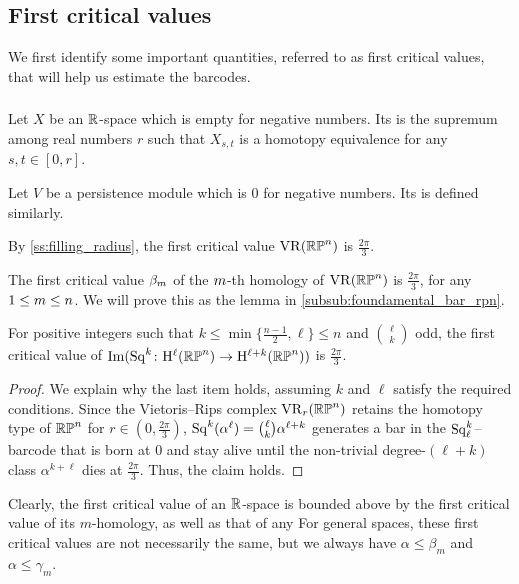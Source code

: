 \subsection{First critical values}

We first identify some important quantities, referred to as first critical values, that will help us estimate the barcodes.

\subsubsection{}
\label{subsub:first_critical_value}

 Let $X$ be an $\mathbb{R}$-space which is empty for negative numbers.
Its  is the supremum among real numbers $r$ such that $X_{s,t}$ is a homotopy equivalence for any $s,t \in [0,r]$. 

Let $V$ be a persistence module which is $0$ for negative numbers.
Its  is defined similarly. 

\medskip\example
By \cref{ss:filling_radius}, the first critical value $\operatorname{VR}(\mathbb{RP}^n)$ is $\tfrac{2\pi}{3}$.

    The first critical value $\beta_m$ of the $m$-th homology of $\operatorname{VR}(\mathbb{RP}^n)$ is $\tfrac{2\pi}{3}$, for any $1 \leq m \leq n$. We will prove this as the lemma in \cref{subsub:foundamental_bar_rpn}.
    

\medskip\lemma
For positive integers such that $k \leq \min\{\frac{n-1}{2}, \ell\} \leq n$ and $\binom{\ell}{k}$ odd,
the first critical value of $\operatorname{Im} (\operatorname{Sq}^k \colon \mathrm{H}^\ell(\mathbb{RP}^n) \to \mathrm{H}^{\ell+k}(\mathbb{RP}^n))$ is $\tfrac{2\pi}{3}$.

\begin{proof}
	We explain why the last item holds, assuming $k$ and $\ell$ satisfy the required conditions.
	Since the Vietoris--Rips complex $\operatorname{VR}_r(\mathbb{RP}^n)$ retains the homotopy type of $\mathbb{RP}^n$ for $r \in (0,\tfrac{2\pi}{3})$, $\operatorname{Sq}^k(\alpha^\ell) = \binom{\ell}{k}\alpha^{\ell+k}$ generates a bar in the $\operatorname{Sq}^k_\ell$--barcode that is born at $0$ and stay alive until the non-trivial degree-$(\ell+k)$ class $\alpha^{k+\ell}$ dies at $\tfrac{2\pi}{3}$.
	Thus, the claim holds.
\end{proof}

\medskip\remark
Clearly, the first critical value of an $\mathbb{R}$-space is bounded above by the first critical value of its $m$-homology, as well as that of any 
For general spaces, these first critical values are not necessarily the same, but we always have $\alpha \leq \beta_m$ and $\alpha \leq \gamma_m$.

